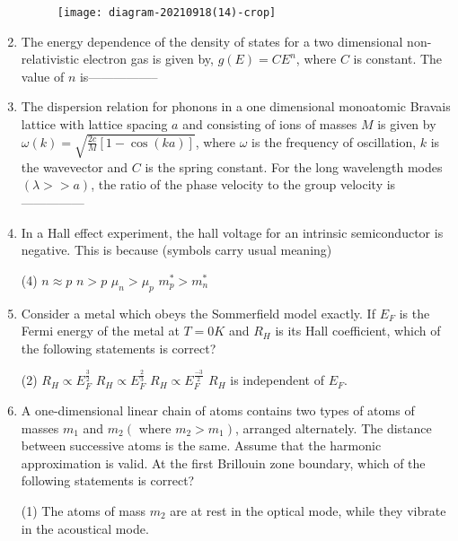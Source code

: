 \begin{enumerate}
\begin{tasks}
\begin{figure}[H]
\end{figure}
\task[\textbf{D.}] \begin{figure}[H]
	\centering
	\texttt{[image: diagram-20210918(14)-crop]}
\end{figure}
\end{tasks}
	\item The energy dependence of the density of states for a two dimensional non-relativistic electron gas is given by, $g(E)=C E^{n}$, where $C$ is constant. The value of $n$ is-----------------
{	}
	\item The dispersion relation for phonons in a one dimensional monoatomic Bravais lattice with lattice spacing $a$ and consisting of ions of masses $M$ is given by $\omega(k)=\sqrt{\frac{2 c}{M}[1-\cos (k a)]}$, where $\omega$ is the frequency of oscillation, $k$ is the wavevector and $C$ is the spring constant. For the long wavelength modes $(\lambda>>a)$, the ratio of the phase velocity to the group velocity is---------------
{	}
	\item In a Hall effect experiment, the hall voltage for an intrinsic semiconductor is negative. This is because (symbols carry usual meaning)
	{}
\begin{tasks}(4)
\task[\textbf{A.}] $n \approx p$
\task[\textbf{B.}] $n>p$
\task[\textbf{C.}] $\mu_{n}>\mu_{p}$
\task[\textbf{D.}] $m_{p}^{*}>m_{n}^{*}$
\end{tasks}
	\item Consider a metal which obeys the Sommerfield model exactly. If $E_{F}$ is the Fermi energy of the metal at $T=0 K$ and $R_{H}$ is its Hall coefficient, which of the following statements is correct?
{	}
\begin{tasks}(2)
\task[\textbf{A.}] $R_{H} \propto E_{F}^{\frac{3}{2}}$
\task[\textbf{B.}] $R_{H} \propto E_{F}^{\frac{2}{3}}$
\task[\textbf{C.}] $R_{H} \propto E_{F}^{\frac{-3}{2}}$
\task[\textbf{D.}] $R_{H}$ is independent of $E_{F}$.
\end{tasks}
	\item A one-dimensional linear chain of atoms contains two types of atoms of masses $m_{1}$ and $m_{2}\left(\right.$ where $\left.m_{2}>m_{1}\right)$, arranged alternately. The distance between successive atoms is the same. Assume that the harmonic approximation is valid. At the first Brillouin zone boundary, which of the following statements is correct?
{	}
\begin{tasks}(1)
\task[\textbf{A.}]  The atoms of mass $m_{2}$ are at rest in the optical mode, while they vibrate in the acoustical mode.

\end{tasks}
\end{enumerate}
